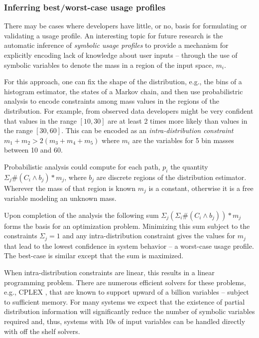 \subsubsection{Inferring best/worst-case usage profiles}
There may be cases where developers have little, or no, basis for
formulating or validating a usage profile.  An interesting topic for
future research is the automatic inference of {\em symbolic usage
  profiles} to provide a mechanism for explicitly encoding lack of
knowledge about user inputs -- through the use of symbolic variables
to denote the mass in a region of the input space, $m_i$.

For this approach, one can fix the shape of the
distribution, e.g., the bins of a histogram estimator, the states of a
Markov chain, and then use probabilistric analysis to encode
constraints among mass values in the regions of the distribution.  
For example, from observed data developers might be
very confident that values in the range $[10,30]$ are at least 2
times more likely than values in the range $[30,60]$.  This can be
encoded as an \textit{intra-distribution constraint} $m_1 + m_2 >
2(m_3 + m_4 + m_5)$ where $m_i$ are the variables for 5 bin masses
between 10 and 60.

Probabilistic analysis could compute for each path, $p_i$
the quantity $\Sigma_{j} \#(C_i \wedge b_j)*m_j$, where $b_j$ are discrete
regions of the distribution estimator.  Wherever the mass
of that region is known $m_j$ is a constant, otherwise it is
a free variable modeling an unknown mass.

Upon completion of the analysis the following sum
$\Sigma_{j} (\Sigma_i \#(C_i \wedge b_j)) *m_j$
forms the basis for an optimization problem.
Minimizing this sum subject to the constraints  
$\Sigma_j = 1$ and any intra-distribution constraint gives
the values for $m_j$ that lead to the lowest confidence in
system behavior -- a worst-case usage profile.  The best-case
is similar except that the sum is maximized.

When intra-distribution constraints are linear, this results
in a linear programming problem.  There are numerous efficient solvers
for these problems, e.g., CPLEX \cite{cplex2009v12}, that are known to
support upward of a billion variables -- subject to sufficient memory.
For many systems we expect that the existence of partial distribution
information
will significantly reduce the number of symbolic variables required
and, thus, systems with 10s of input variables can be handled
directly with off the shelf solvers. 

